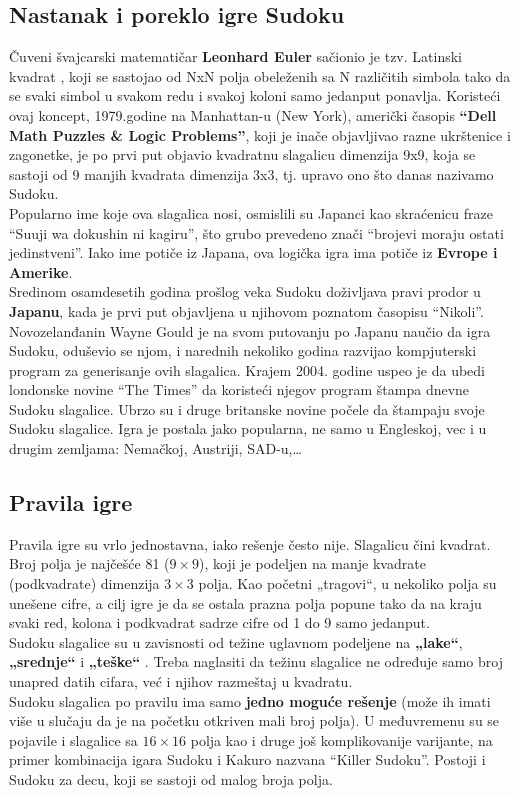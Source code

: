 \documentclass[a4paper]{article}
\begin{document}
\subsection{Nastanak i poreklo igre Sudoku}
Čuveni švajcarski matematičar \textbf{Leonhard Euler} sačionio je tzv. Latinski kvadrat , koji se sastojao od NxN polja obeleženih sa N različitih simbola tako da se svaki simbol u svakom redu i svakoj koloni samo jedanput ponavlja. Koristeći ovaj koncept, 1979.godine na Manhattan-u (New York), američki časopis \textbf{“Dell Math Puzzles \& Logic Problems”}, koji je inače objavljivao razne ukrštenice i zagonetke, je po prvi put objavio kvadratnu slagalicu dimenzija 9x9, koja se sastoji od 9 manjih kvadrata dimenzija 3x3, tj. upravo ono što danas nazivamo Sudoku. \\
Popularno ime koje ova slagalica nosi, osmislili su Japanci kao skraćenicu fraze “Suuji wa dokushin ni kagiru”, što grubo prevedeno znači “brojevi moraju ostati jedinstveni”. Iako ime potiče iz Japana, ova logička igra ima potiče iz \textbf{Evrope i Amerike}.\\
Sredinom osamdesetih godina prošlog veka Sudoku doživljava pravi prodor u \textbf{Japanu}, kada je prvi put objavljena u njihovom poznatom časopisu “Nikoli”. Novozelanđanin Wayne Gould je na svom putovanju po Japanu naučio da igra Sudoku, oduševio se njom, i narednih nekoliko godina razvijao kompjuterski program za generisanje ovih slagalica. Krajem 2004. godine uspeo je da ubedi londonske novine “The Times” da koristeći njegov program štampa dnevne Sudoku slagalice. Ubrzo su i druge britanske novine počele da štampaju svoje Sudoku slagalice. Igra je postala jako popularna, ne samo u Engleskoj, vec i u drugim zemljama: Nemačkoj, Austriji, SAD-u,…


\subsection{Pravila igre}
Pravila igre su vrlo jednostavna, iako rešenje često nije. Slagalicu čini kvadrat. Broj polja je najčešće 81 ($9\times9$), koji je podeljen na manje kvadrate (podkvadrate) dimenzija $3\times3$ polja. Kao početni „tragovi“, u nekoliko polja su unešene cifre, a cilj igre je da se ostala prazna polja popune tako da na kraju svaki red, kolona i podkvadrat sadrze cifre od 1 do 9 samo jedanput.\\ Sudoku slagalice su u zavisnosti od težine uglavnom podeljene na \textbf{„lake“}, \textbf{„srednje“} i \textbf{„teške“} . Treba naglasiti da težinu slagalice ne određuje samo broj unapred datih cifara, već i njihov razmeštaj u kvadratu.\\
Sudoku slagalica po pravilu ima samo \textbf{jedno moguće rešenje} (može ih imati više u slučaju da je na početku otkriven mali broj polja). U međuvremenu su se pojavile i slagalice sa $16\times16$ polja kao i druge još komplikovanije varijante, na primer kombinacija igara Sudoku i Kakuro nazvana “Killer Sudoku”. Postoji i Sudoku za decu, koji se sastoji od malog broja polja.
\end{document}
